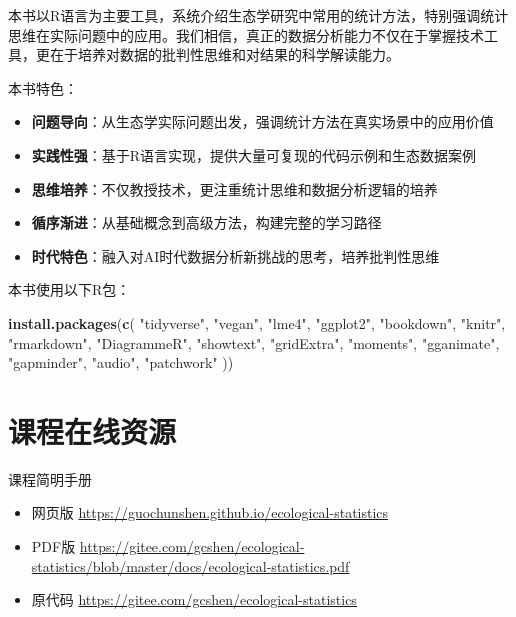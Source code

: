 \documentclass[
  twoside]{book}
\newenvironment{Shaded}{\begin{snugshade}}{\end{snugshade}}
\newcommand{\FunctionTok}[1]{\textcolor[rgb]{0.13,0.29,0.53}{\textbf{#1}}}
\newcommand{\NormalTok}[1]{#1}
\newcommand{\StringTok}[1]{\textcolor[rgb]{0.31,0.60,0.02}{#1}}
\providecommand{\tightlist}{%
  \setlength{\itemsep}{0pt}\setlength{\parskip}{0pt}}
\begin{document}
本书以R语言为主要工具，系统介绍生态学研究中常用的统计方法，特别强调统计思维在实际问题中的应用。我们相信，真正的数据分析能力不仅在于掌握技术工具，更在于培养对数据的批判性思维和对结果的科学解读能力。

本书特色：

\begin{itemize}
\tightlist
\item
  \textbf{问题导向}：从生态学实际问题出发，强调统计方法在真实场景中的应用价值
\item
  \textbf{实践性强}：基于R语言实现，提供大量可复现的代码示例和生态数据案例
\item
  \textbf{思维培养}：不仅教授技术，更注重统计思维和数据分析逻辑的培养
\item
  \textbf{循序渐进}：从基础概念到高级方法，构建完整的学习路径
\item
  \textbf{时代特色}：融入对AI时代数据分析新挑战的思考，培养批判性思维
\end{itemize}

本书使用以下R包：

\begin{Shaded}
\begin{Highlighting}[]
\FunctionTok{install.packages}\NormalTok{(}\FunctionTok{c}\NormalTok{(}
  \StringTok{"tidyverse"}\NormalTok{, }\StringTok{"vegan"}\NormalTok{, }\StringTok{"lme4"}\NormalTok{, }\StringTok{"ggplot2"}\NormalTok{,}
  \StringTok{"bookdown"}\NormalTok{, }\StringTok{"knitr"}\NormalTok{, }\StringTok{"rmarkdown"}\NormalTok{, }\StringTok{"DiagrammeR"}\NormalTok{,}
  \StringTok{"showtext"}\NormalTok{, }\StringTok{"gridExtra"}\NormalTok{, }\StringTok{"moments"}\NormalTok{,}
  \StringTok{"gganimate"}\NormalTok{, }\StringTok{"gapminder"}\NormalTok{, }\StringTok{"audio"}\NormalTok{, }\StringTok{"patchwork"}
\NormalTok{))}
\end{Highlighting}
\end{Shaded}

\hypertarget{ux8bfeux7a0bux5728ux7ebfux8d44ux6e90}{%
\section{课程在线资源}\label{ux8bfeux7a0bux5728ux7ebfux8d44ux6e90}}

课程简明手册

\begin{itemize}
\tightlist
\item
  网页版 \url{https://guochunshen.github.io/ecological-statistics}
\item
  PDF版 \url{https://gitee.com/gcshen/ecological-statistics/blob/master/docs/ecological-statistics.pdf}
\item
  原代码 \url{https://gitee.com/gcshen/ecological-statistics}
\end{itemize}
\end{document}
